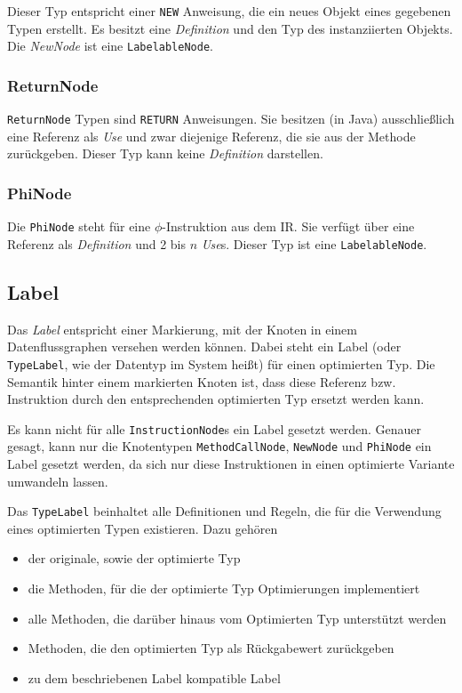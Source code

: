 Dieser Typ entspricht einer \texttt{NEW} Anweisung, die ein neues Objekt eines 
gegebenen Typen erstellt. Es besitzt eine \textit{Definition} und den Typ des instanziierten
Objekts. Die \textit{NewNode} ist eine \texttt{LabelableNode}.

\subsubsection{ReturnNode}

\texttt{ReturnNode} Typen sind \texttt{RETURN} Anweisungen. Sie besitzen (in Java)
ausschließlich eine Referenz als \textit{Use} und zwar diejenige Referenz, die sie aus der Methode 
zurückgeben. Dieser Typ kann keine \textit{Definition} darstellen.

\subsubsection{PhiNode}

Die \texttt{PhiNode} steht für eine $\phi$-Instruktion aus dem IR. Sie verfügt über eine
Referenz als \textit{Definition} und 2 bis $n$ \textit{Use}s. Dieser Typ ist eine \texttt{LabelableNode}.

\subsection{Label}

Das \textit{Label} entspricht einer Markierung, mit der Knoten in einem 
Datenflussgraphen versehen werden können. Dabei steht ein Label (oder 
\texttt{TypeLabel}, wie der Datentyp im System heißt) für einen optimierten Typ.
Die Semantik hinter einem markierten Knoten ist, dass diese Referenz bzw. Instruktion
durch den entsprechenden optimierten Typ ersetzt werden kann.

Es kann nicht für alle \texttt{InstructionNode}s ein Label gesetzt werden. Genauer
gesagt, kann nur die Knotentypen \texttt{MethodCallNode}, \texttt{NewNode} und 
\texttt{PhiNode} ein Label gesetzt werden, da sich nur diese 
Instruktionen in einen optimierte Variante umwandeln lassen.

Das \texttt{TypeLabel} beinhaltet alle Definitionen und Regeln, die für die Verwendung 
eines optimierten Typen existieren. Dazu gehören

\begin{itemize}
	\item der originale, sowie der optimierte Typ
	\item die Methoden, für die der optimierte Typ Optimierungen implementiert
	\item alle Methoden, die darüber hinaus vom Optimierten Typ unterstützt werden
	\item Methoden, die den optimierten Typ als Rückgabewert zurückgeben
	\item zu dem beschriebenen Label kompatible Label
\end{itemize}

